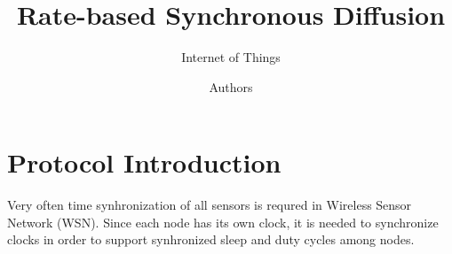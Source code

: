 \documentclass{llncs}
\begin{document}
\title{Rate-based Synchronous Diffusion}


\subtitle{Internet of Things}


\author{Authors} 







\maketitle


\begin{comment}
Protocol introduction: Maximum 1 page about the theoretical basics of the experiment.
\end{comment}
\section{Protocol Introduction}
Very often time synhronization of all sensors is requred in Wireless Sensor Network (WSN). Since each node has its own clock, it is  needed to synchronize clocks in order to support synhronized sleep and duty cycles among nodes.
\end{document}
